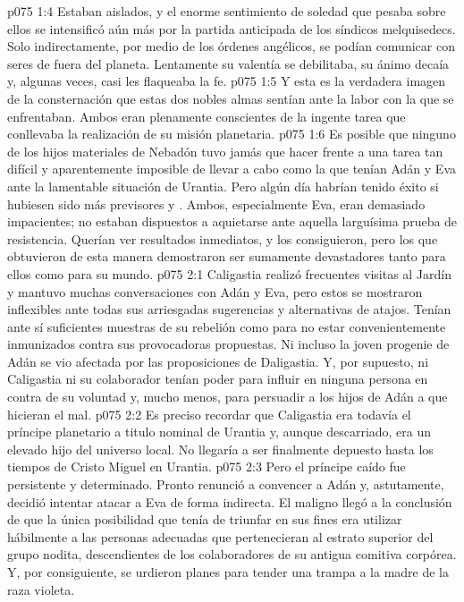 \vs p075 1:4 Estaban aislados, y el enorme sentimiento de soledad que pesaba sobre ellos se intensificó aún más por la partida anticipada de los síndicos melquisedecs. Solo indirectamente, por medio de los órdenes angélicos, se podían comunicar con seres de fuera del planeta. Lentamente su valentía se debilitaba, su ánimo decaía y, algunas veces, casi les flaqueaba la fe.
\vs p075 1:5 Y esta es la verdadera imagen de la consternación que estas dos nobles almas sentían ante la labor con la que se enfrentaban. Ambos eran plenamente conscientes de la ingente tarea que conllevaba la realización de su misión planetaria.
\vs p075 1:6 Es posible que ninguno de los hijos materiales de Nebadón tuvo jamás que hacer frente a una tarea tan difícil y aparentemente imposible de llevar a cabo como la que tenían Adán y Eva ante la lamentable situación de Urantia. Pero algún día habrían tenido éxito si hubiesen sido más previsores y . Ambos, especialmente Eva, eran demasiado impacientes; no estaban dispuestos a aquietarse ante aquella larguísima prueba de resistencia. Querían ver resultados inmediatos, y los consiguieron, pero los que obtuvieron de esta manera demostraron ser sumamente devastadores tanto para ellos como para su mundo.
\vs p075 2:1 Caligastia realizó frecuentes visitas al Jardín y mantuvo muchas conversaciones con Adán y Eva, pero estos se mostraron inflexibles ante todas sus arriesgadas sugerencias y alternativas de atajos. Tenían ante sí suficientes muestras de su rebelión como para no estar convenientemente inmunizados contra sus provocadoras propuestas. Ni incluso la joven progenie de Adán se vio afectada por las proposiciones de Daligastia. Y, por supuesto, ni Caligastia ni su colaborador tenían poder para influir en ninguna persona en contra de su voluntad y, mucho menos, para persuadir a los hijos de Adán a que hicieran el mal.
\vs p075 2:2 Es preciso recordar que Caligastia era todavía el príncipe planetario a titulo nominal de Urantia y, aunque descarriado, era un elevado hijo del universo local. No llegaría a ser finalmente depuesto hasta los tiempos de Cristo Miguel en Urantia.
\vs p075 2:3 Pero el príncipe caído fue persistente y determinado. Pronto renunció a convencer a Adán y, astutamente, decidió intentar atacar a Eva de forma indirecta. El maligno llegó a la conclusión de que la única posibilidad que tenía de triunfar en sus fines era utilizar hábilmente a las personas adecuadas que pertenecieran al estrato superior del grupo nodita, descendientes de los colaboradores de su antigua comitiva corpórea. Y, por consiguiente, se urdieron planes para tender una trampa a la madre de la raza violeta.
